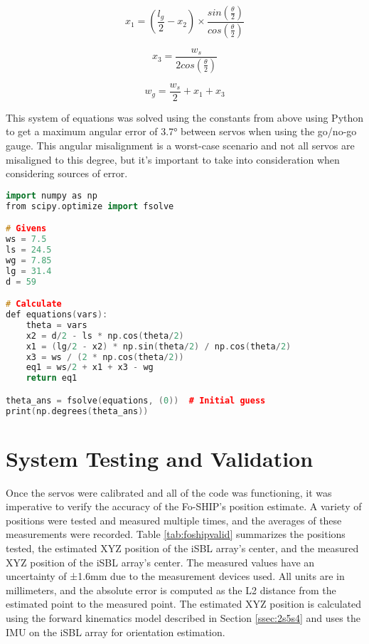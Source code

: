 \documentclass[11pt]{ucthesisCP}
\begin{document}
\begin{equation}\label{eq:2ew15}
	x_1 = (\frac{l_g}{2} - x_2) \times \frac{sin(\frac{\theta}{2})}{cos(\frac{\theta}{2})}
\end{equation}

\begin{equation}\label{eq:2eq16}
	x_3 = \frac{w_s}{2cos(\frac{\theta}{2})}
\end{equation}

\begin{equation}\label{eq:2eq17}
	w_g = \frac{w_s}{2} + x_1 + x_3
\end{equation}

This system of equations was solved using the constants from above using Python to get a maximum angular error of 3.7° between servos when using the go/no-go gauge. This angular misalignment is a worst-case scenario and not all servos are misaligned to this degree, but it’s important to take into consideration when considering sources of error.

\begin{lstlisting}[language=C++]
import numpy as np
from scipy.optimize import fsolve

# Givens
ws = 7.5
ls = 24.5
wg = 7.85
lg = 31.4
d = 59

# Calculate
def equations(vars):
	theta = vars
	x2 = d/2 - ls * np.cos(theta/2)
	x1 = (lg/2 - x2) * np.sin(theta/2) / np.cos(theta/2)
	x3 = ws / (2 * np.cos(theta/2))
	eq1 = ws/2 + x1 + x3 - wg
	return eq1

theta_ans = fsolve(equations, (0))  # Initial guess
print(np.degrees(theta_ans))
\end{lstlisting}

\section{System Testing and Validation} \label{sec:2s7}
Once the servos were calibrated and all of the code was functioning, it was imperative to verify the accuracy of the Fo-SHIP’s position estimate. A variety of positions were tested and measured multiple times, and the averages of these measurements were recorded. Table \ref{tab:foshipvalid} summarizes the positions tested, the estimated XYZ position of the iSBL array’s center, and the measured XYZ position of the iSBL array’s center. The measured values have an uncertainty of ±1.6mm due to the measurement devices used. All units are in millimeters, and the absolute error is computed as the L2 distance from the estimated point to the measured point. The estimated XYZ position is calculated using the forward kinematics model described in Section \ref{ssec:2s5s4} and uses the IMU on the iSBL array for orientation estimation.
\end{document}
